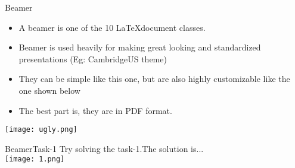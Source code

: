 \begin{frame}{Beamer}

    \begin{itemize}
        \item A beamer is one of the 10 \LaTeX  document classes.
        \item Beamer is used heavily for making great looking and standardized
            presentations (Eg: CambridgeUS theme)
        \item They can be simple like this one, but are also highly customizable
            like the one shown below
        \item The best part is, they are in PDF format.
    \end{itemize}

    \center
    \texttt{[image: ugly.png]}

\end{frame}

\begin{frame}{Beamer}{Task-1}
    Try solving the task-1.The solution is... \\ \pause
    \vspace{1em}
    \texttt{[image: 1.png]}
\end{frame}
